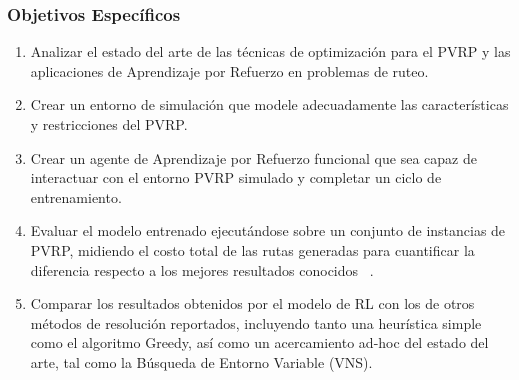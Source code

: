 \subsubsection{Objetivos Específicos}
\begin{enumerate}
    \item Analizar el estado del arte de las técnicas de optimización para el PVRP y las aplicaciones de Aprendizaje por Refuerzo en problemas de ruteo.
    \item Crear un entorno de simulación que modele adecuadamente las características y restricciones del PVRP.
    \item Crear un agente de Aprendizaje por Refuerzo funcional que sea capaz de interactuar con el entorno PVRP simulado y completar un ciclo de entrenamiento.
    \item Evaluar el modelo entrenado ejecutándose sobre un conjunto de instancias de PVRP, midiendo el costo total de las rutas generadas para cuantificar la diferencia respecto a los mejores resultados conocidos ~\cite{NEO2013}. 
    \item Comparar los resultados obtenidos por el modelo de RL con los de otros métodos de resolución reportados, incluyendo tanto una heurística simple como el algoritmo Greedy, así como un acercamiento ad-hoc del estado del arte, tal como la Búsqueda de Entorno Variable (VNS).
\end{enumerate}
